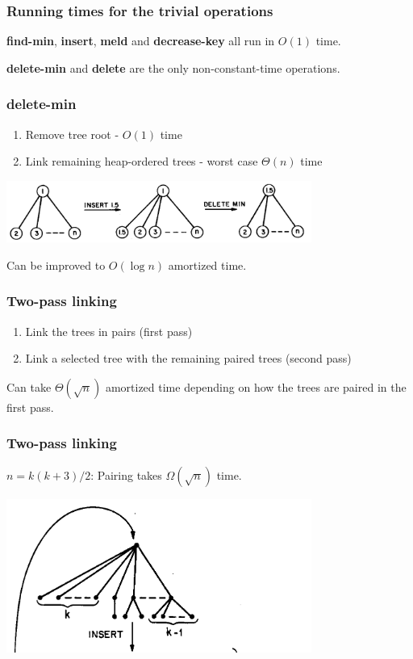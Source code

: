 \documentclass{beamer}
\begin{document}
\begin{frame}
\frametitle{Running times for the trivial operations}

\textbf{find-min}, \textbf{insert}, \textbf{meld} and \textbf{decrease-key} all
run in $O(1)$ time.

\textbf{delete-min} and \textbf{delete} are the only non-constant-time
operations.

\end{frame}

\begin{frame}
\frametitle{delete-min}

\begin{enumerate}
\item Remove tree root - $O(1)$ time
\item Link remaining heap-ordered trees - worst case $\Theta(n)$ time
\end{enumerate}

\includegraphics[width=10cm]{fig4.png}

Can be improved to $O(\log n)$ amortized time.

\end{frame}
 
\begin{frame}
\frametitle{Two-pass linking}

\begin{enumerate}
\item Link the trees in pairs (first pass)
\item Link a selected tree with the remaining paired trees (second pass)
\end{enumerate}

Can take $\Theta(\sqrt{n})$ amortized time depending on how the trees are paired
in the first pass.
\end{frame}
 
\begin{frame}
\frametitle{Two-pass linking}

$n = k(k+3)/2$: Pairing takes $\Omega(\sqrt{n})$ time.

\includegraphics[width=10cm]{fig5-1.png}

\end{frame}
 
\end{document}
